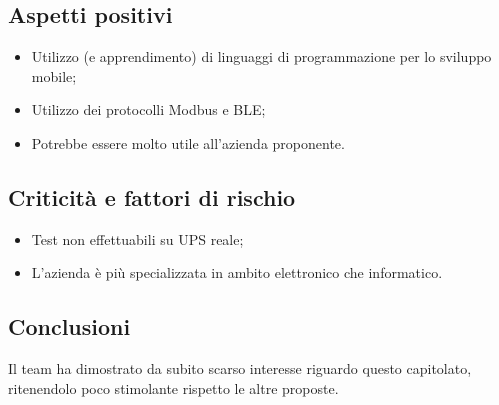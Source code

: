 	\subsection{Aspetti positivi}
		\begin{itemize}
			\item Utilizzo (e apprendimento) di linguaggi di programmazione per lo sviluppo mobile;
			\item Utilizzo dei protocolli Modbus\glo{} e BLE\glo{};
			\item Potrebbe essere molto utile all'azienda proponente.
		\end{itemize}

	\subsection {Criticità e fattori di rischio}
		\begin{itemize}
			\item Test non effettuabili su UPS\glo{} reale;
			\item L'azienda è più specializzata in ambito elettronico che informatico.
	\end{itemize}

\subsection {Conclusioni}
	Il team ha dimostrato da subito scarso interesse riguardo questo capitolato, ritenendolo poco stimolante rispetto le altre proposte.